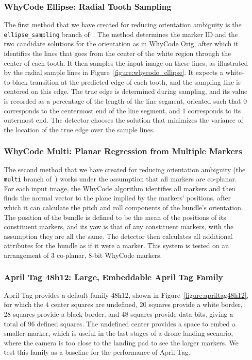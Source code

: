 \subsubsection{WhyCode Ellipse: Radial Tooth Sampling}
The first method that we have created for reducing orientation ambiguity is the \texttt{ellipse\_sampling} branch of~\cite{uzgit_whycon}.
The method determines the marker ID and the two candidate solutions for the orientation as in WhyCode Orig,
after which it identifies the lines that goes from the center of the white region through the center of each tooth.
It then samples the input image on these lines,
as illustrated by the radial sample lines in Figure~\ref{figure:whycode_ellipse}.
It expects a white-to-black transition at the predicted edge of each tooth, and the sampling line is centered on this edge.
The true edge is determined during sampling, and its value is recorded as a percentage of the length of the line segment,
oriented such that 0 corresponds to the centermost end of the line segment, and 1 corresponds to its outermost end.
The detector chooses the solution that minimizes the variance of the location of the true edge over the sample lines.

\subsubsection{WhyCode Multi: Planar Regression from Multiple Markers}
The second method that we have created for reducing orientation ambiguity (the \texttt{multi} branch of~\cite{uzgit_whycon})
works under the assumption that all markers are co-planar.
For each input image, the WhyCode algorithm identifies all markers and
then finds the normal vector to the plane implied by the markers' positions,
after which it can calculate the pitch and roll components of the bundle's orientation.
The position of the bundle is defined to be the mean of the positions of its constituent markers,
and its yaw is that of any constituent markers, with the assumption they are all the same.
The detector then calculates all additional attributes for the bundle as if it were a marker.
This system is tested on an arrangement of 3 co-planar, 8-bit WhyCode markers.

\subsubsection{April Tag 48h12: Large, Embeddable April Tag Family}
April Tag provides a default family 48h12, shown in Figure~\ref{figure:apriltag48h12},
for which the 4 center squares are undefined,
20 squares provide a white border,
28 squares provide a black border,
and 48 squares provide data bits,
giving a total of 96 defined squares.
The undefined center provides a space to embed a smaller marker,
which is useful in the last stages of a drone landing scenario,
where the camera is too close to the landing pad to see the larger markers.
We test this family as a baseline for the performance of April Tag.

